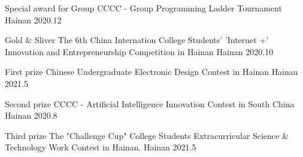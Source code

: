 \begin{cvhonors}
	
	\cvhonor
	{Special award for Group} %
	{CCCC - Group Programming Ladder Tournament} %
	{Hainan} %
	{2020.12} %
	
		
	\cvhonor
	{Gold \& Sliver} %
	{The 6th China Internation College Students' 'Internet +' Innovation and Entrepreneurship Competition in Hainan} %
	{Hainan} %
	{2020.10} %
	
	\cvhonor
	{First prize} %
	{Chinese Undergraduate Electronic Design Contest in Hainan} %
	{Hainan} %
	{2021.5} %
	
	\cvhonor
	{Second prize} %
	{CCCC - Artificial Intelligence Innovation Contest in South China} %
	{Hainan} %
	{2020.8} %
	
	\cvhonor
	{Third prize} %
	{The "Challenge Cup" College Students Extracurricular Science \& Technology Work Contest in Hainan.} %
	{Hainan} %
	{2021.5} %
	
\end{cvhonors}
